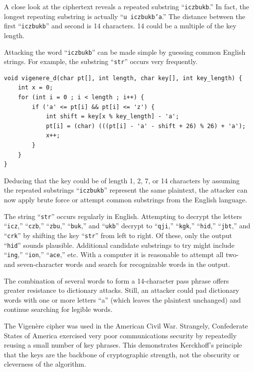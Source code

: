 \documentclass{book}
\begin{document}
A close look at the ciphertext reveals a repeated substring ``\texttt{iczbukb}.'' In fact, the longest repeating substring is actually ``\texttt{u iczbukb'a}.'' The distance between the first ``\texttt{iczbukb}'' and second is 14 characters. 14 could be a multiple of the key length.

Attacking the word ``\texttt{iczbukb}'' can be made simple by guessing common English strings. For example, the substring ``\texttt{str}'' occurs very frequently.

\begin{lstlisting}[caption={A C function to decrypt a string using the Vigen\`ere cipher},captionpos=b]
void vigenere_d(char pt[], int length, char key[], int key_length) {
    int x = 0;
    for (int i = 0 ; i < length ; i++) {
        if ('a' <= pt[i] && pt[i] <= 'z') {
            int shift = key[x % key_length] - 'a';
            pt[i] = (char) (((pt[i] - 'a' - shift + 26) % 26) + 'a');
            x++;
        }
    }
}
\end{lstlisting}

Deducing that the key could be of length 1, 2, 7, or 14 characters by assuming the repeated substrings ``\texttt{iczbukb}'' represent the same plaintext, the attacker can now apply brute force or attempt common substrings from the English language.

The string ``\texttt{str}'' occurs regularly in English. Attempting to decrypt the letters ``\texttt{icz},'' ``\texttt{czb},'' ``\texttt{zbu},'' ``\texttt{buk},'' and ``\texttt{ukb}'' decrypt to ``\texttt{qji},'' ``\texttt{kgk},'' ``\texttt{hid},'' ``\texttt{jbt},'' and ``\texttt{crk}'' by shifting the key ``\texttt{str}'' from left to right. Of these, only the output ``\texttt{hid}'' sounds plausible. Additional candidate substrings to try might include ``\texttt{ing},'' ``\texttt{ion},'' ``\texttt{ace},'' etc. With a computer it is reasonable to attempt all two- and seven-character words and search for recognizable words in the output.

The combination of several words to form a 14-character pass phrase offers greater resistance to dictionary attacks. Still, an attacker could pad dictionary words with one or more letters ``a'' (which leaves the plaintext unchanged) and continue searching for legible words.

The Vigen\`ere cipher was used in the American Civil War. Strangely, Confederate States of America exercised very poor communications security by repeatedly reusing a small number of key phrases. This demonstrates Kerckhoff's principle that the keys are the backbone of cryptographic strength, not the obscurity or cleverness of the algorithm.
\end{document}
